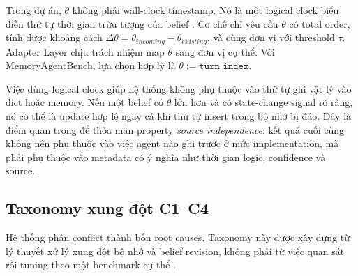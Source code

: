\documentclass[12pt,a4paper]{article}
\begin{document}
Trong dự án, \(\theta\) không phải wall-clock timestamp. Nó là một logical clock biểu diễn thứ tự thời gian trừu tượng của belief \cite{lamport1978}. Cơ chế chỉ yêu cầu \(\theta\) có total order, tính được khoảng cách \(\Delta\theta = \theta_{incoming} - \theta_{existing}\), và cùng đơn vị với threshold \(\tau\). Adapter Layer chịu trách nhiệm map \(\theta\) sang đơn vị cụ thể. Với MemoryAgentBench, lựa chọn hợp lý là \(\theta := \texttt{turn\_index}\).

Việc dùng logical clock giúp hệ thống không phụ thuộc vào thứ tự ghi vật lý vào dict hoặc memory. Nếu một belief có \(\theta\) lớn hơn và có state-change signal rõ ràng, nó có thể là update hợp lệ ngay cả khi thứ tự insert trong bộ nhớ bị đảo. Đây là điểm quan trọng để thỏa mãn property \textit{source independence}: kết quả cuối cùng không nên phụ thuộc vào việc agent nào ghi trước ở mức implementation, mà phải phụ thuộc vào metadata có ý nghĩa như thời gian logic, confidence và source.

\subsection{Taxonomy xung đột C1--C4}

Hệ thống phân conflict thành bốn root causes. Taxonomy này được xây dựng từ lý thuyết xử lý xung đột bộ nhớ và belief revision, không phải từ việc quan sát rồi tuning theo một benchmark cụ thể \cite{agm1985,doyle1979}.

\begin{table}[H]
\centering
\caption{Taxonomy C1--C4 của conflict trong shared memory.}
\label{tab:c1c4}
\end{table}
\end{document}
